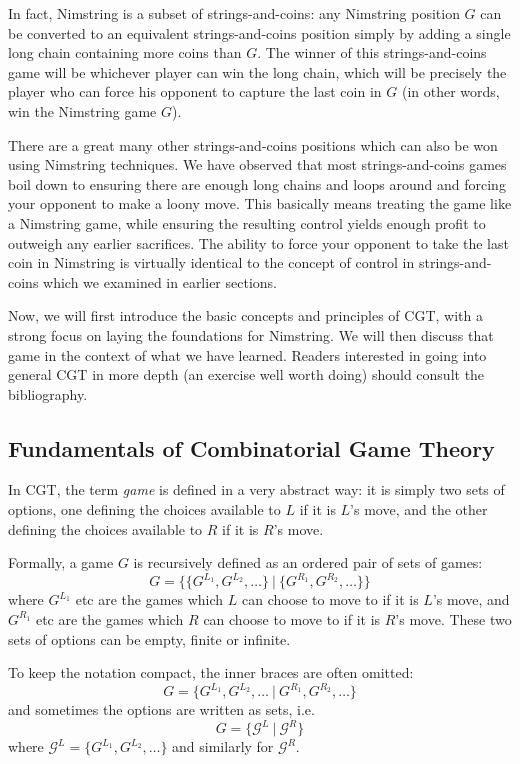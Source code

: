\documentclass[a4paper,twocolumn]{article}
\newcommand{\cgtgame}[2]{\{#1 \:|\: #2\}}
\begin{document}
In fact, Nimstring is a subset of strings-and-coins: any Nimstring
position $G$ can be converted to an equivalent strings-and-coins position
simply by adding a single long chain containing more coins than $G$. The
winner of this strings-and-coins game will be whichever player can win
the long chain, which will be precisely the player who can force his
opponent to capture the last coin in $G$ (in other words, win the Nimstring
game $G$).

There are a great many other strings-and-coins positions which can
also be won using Nimstring techniques. We have observed that most
strings-and-coins games boil down to ensuring there are enough long chains
and loops around and forcing your opponent to make a loony move. This
basically means treating the game like a Nimstring game, while ensuring the
resulting control yields enough profit to outweigh any earlier sacrifices.
The ability to force your opponent to take the last coin in Nimstring is
virtually identical to the concept of control in strings-and-coins which we
examined in earlier sections.

Now, we will first introduce the basic concepts and principles of CGT,
with a strong focus on laying the foundations for Nimstring. We will
then discuss that game in the context of what we have learned. Readers
interested in going into general CGT in more depth (an exercise well
worth doing) should consult the bibliography.

\subsection{Fundamentals of Combinatorial Game Theory}

In CGT, the term \emph{game} is defined in a very abstract way: it is
simply two sets of options, one defining the choices available to $L$
if it is $L$'s move, and the other defining the choices available to
$R$ if it is $R$'s move.

Formally, a game $G$ is recursively defined as an ordered pair of sets
of games: $$G = \cgtgame{\{G^{L_1}, G^{L_2}, \ldots\}}{\{G^{R_1},
  G^{R_2}, \ldots\}}$$ where $G^{L_1}$ etc are the games which $L$ can
choose to move to if it is $L$'s move, and $G^{R_1}$ etc are the games
which $R$ can choose to move to if it is $R$'s move. These two sets of
options can be empty, finite or infinite.

To keep the notation compact, the inner braces are often omitted:
$$G = \cgtgame{G^{L_1}, G^{L_2}, \ldots}{G^{R_1}, G^{R_2}, \ldots}$$
and sometimes the options are written as sets, i.e. $$G =
\cgtgame{\mathcal{G}^L}{\mathcal{G}^R}$$ where $\mathcal{G}^L =
\{G^{L_1}, G^{L_2}, \ldots\}$ and similarly for $\mathcal{G}^R$.
\end{document}
